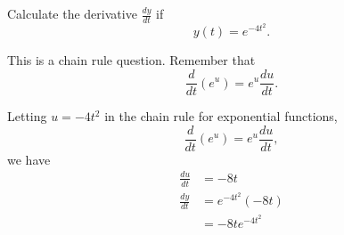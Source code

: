 \documentclass{ximera}
\author{Emma Smith Zbarsky}
\begin{document}
\begin{exercise}

Calculate the derivative $\frac{dy}{dt}$ if \[y(t) = e^{-4t^2}.\]


\begin{hint}
This is a chain rule question. Remember that
\[\frac{d}{dt}\left(e^{u}\right) = e^{u}\frac{du}{dt}.\]
\end{hint}


\begin{hint}
Letting $u= -4t^2$ in the chain rule for exponential functions,
\[\frac{d}{dt}\left(e^{u}\right) = e^{u}\frac{du}{dt},\] we have
\begin{align*}
\frac{du}{dt} &= -8t \\
\frac{dy}{dt} &= e^{-4t^2}\left(-8t\right) \\
&= \boxed{-8te^{-4t^2}} \end{align*}
\end{hint}


\begin{multipleChoice}
\end{multipleChoice}

\end{exercise}
\end{document}
